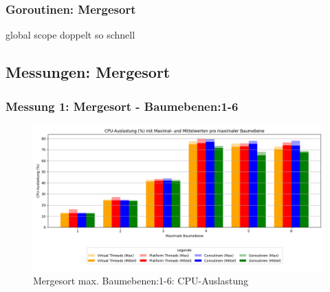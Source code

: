 \documentclass[fontsize=12pt,paper=a4,twoside=semi,parskip=half-,headsepline,headinclude]{scrreprt}
\begin{document}
\subsubsection{Goroutinen: Mergesort}

global scope doppelt so schnell

\subsection{Messungen: Mergesort}

\subsubsection{Messung 1: Mergesort - Baumebenen:1-6}

\begin{figure}[H]
	\centering
	\includegraphics[scale=0.5]{figures/mergesort/Maximalebauebenen1-6/cpu_usage_bar_plot.png}
	\caption{Mergesort max. Baumebenen:1-6: CPU-Auslastung}
	\label{fig:ms1-6CPU}
\end{figure}
\end{document}
